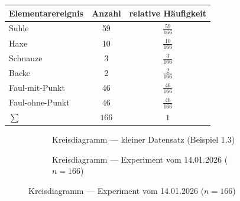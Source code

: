 \begin{bsp}[Schweinewürfeln]
    \begin{mytable}
        \begin{tabular}{lcc}
            \hline
            \textbf{Elementarereignis} & \textbf{Anzahl} & \textbf{relative Häufigkeit} \\
            \hline
            Suhle            & 59  & $\tfrac{59}{166}$ \\
            Haxe              & 10  & $\tfrac{10}{166}$ \\
            Schnauze          & 3   & $\tfrac{3}{166}$ \\
            Backe             & 2   & $\tfrac{2}{166}$ \\
            Faul-mit-Punkt    & 46  & $\tfrac{46}{166}$ \\
            Faul-ohne-Punkt   & 46  & $\tfrac{46}{166}$ \\
            \hline
            $\sum$            & $166$ & $1$ \\
            \hline
        \end{tabular}
    \end{mytable}
\end{bsp}


\begin{figure}[H]
    \centering
    \begin{subfigure}[t]{0.48\textwidth}
        \centering
        \caption{Kreisdiagramm --- kleiner Datensatz (Beispiel 1.3)}
    \end{subfigure}
    \hfill
    \begin{subfigure}[t]{0.48\textwidth}
        \centering
       \caption{ Kreisdiagramm --- Experiment vom 14.01.2026 ($n=166$)}
    \end{subfigure}\label{fig:figure4}
\end{figure}


